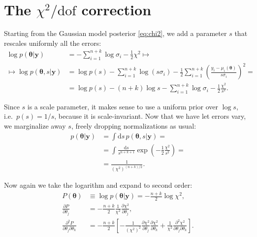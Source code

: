 \section{The $\chi^2/\mathrm{dof}$ correction}

Starting from the Gaussian model posterior \eqref{eq:chi2}, we add a parameter
$s$ that rescales uniformly all the errors:
%
\begin{align}
    \log p(\boldsymbol\theta|\mathbf y)
    &= -\sum_{i=1}^{n+k} \log\sigma_i - \frac12 \chi^2 \mapsto \\
    \mapsto \log p(\boldsymbol\theta,s|\mathbf y)
    &= \log p(s) -\sum_{i=1}^{n+k} \log(s \sigma_i)
    - \frac 12 \sum_{i=1}^{n+k}
    \left( \frac {y_i - \mu_i(\boldsymbol\theta)} {s \sigma_i} \right)^2 = \\
    &= \log p(s) - (n+k) \log s - \sum_{i=1}^{n+k} \log\sigma_i
    - \frac 12 \frac{\chi^2}{s^2}.
\end{align}

Since $s$ is a scale parameter, it makes sense to use a uniform prior over
$\log s$, i.e.\ $p(s) = 1/s$, because it is scale-invariant. Now that we have
let errors vary, we marginalize away $s$, freely dropping normalizations as
usual:
%
\begin{align}
    p(\boldsymbol\theta|\mathbf y)
    &= \int \mathrm ds\,
    p(\boldsymbol\theta,s|\mathbf y) = \\
    &= \int \frac {\mathrm ds} {s^{n+k+1}}
    \exp\left(-\frac12 \frac {\chi^2} {s^2}\right) = \\
    &= \frac 1 {(\chi^2)^{(n+k)/2}}.
\end{align}

Now again we take the logarithm and expand to second order:
%
\begin{align}
    P(\boldsymbol\theta) &\equiv
    \log p(\boldsymbol\theta|\mathbf y)
    = -\frac{n+k}2 \log \chi^2, \\
    \frac {\partial P} {\partial \theta_j}
    &= -\frac{n+k}2 \frac 1{\chi^2}
    \frac {\partial \chi^2} {\partial \theta_j}, \\
    \frac {\partial^2 P} {\partial\theta_j \partial\theta_k}
    &= -\frac{n+k}2 \left[
    -\frac 1 {(\chi^2)^2}
    \frac {\partial \chi^2} {\partial \theta_j}
    \frac {\partial \chi^2} {\partial \theta_k}
    + \frac 1{\chi^2}
    \frac {\partial^2 \chi^2} {\partial\theta_j \partial\theta_k}
    \right]. \label{eq:Pjk}
\end{align}


